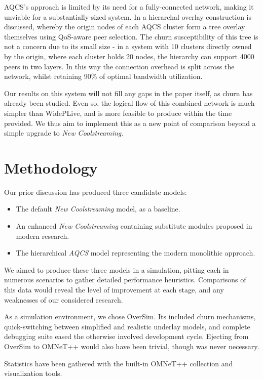 \documentclass[12pt,a4paper]{article}
\begin{document}
AQCS's approach is limited by its need for a fully-connected network, making it unviable for a substantially-sized system. In \cite{Liang2007} a hierarchal overlay construction is discussed, whereby the origin nodes of each AQCS cluster form a tree overlay themselves using QoS-aware peer selection. The churn susceptibility of this tree is not a concern due to its small size - in a system with 10 clusters directly owned by the origin, where each cluster holds 20 nodes, the hierarchy can support 4000 peers in two layers. In this way the connection overhead is split across the network, whilst retaining 90\% of optimal bandwidth utilization.

Our results on this system will not fill any gaps in the paper itself, as churn has already been studied. Even so, the logical flow of this combined network is much simpler than WidePLive, and is more feasible to produce within the time provided. We thus aim to implement this as a new point of comparison beyond a simple upgrade to \textit{New Coolstreaming}.

\section{Methodology} \label{methodology}
Our prior discussion has produced three candidate models:

\begin{itemize}
	\item The default \textit{New Coolstreaming} model, as a baseline.
	\item An enhanced \textit{New Coolstreaming} containing substitute modules proposed in modern research.
	\item The hierarchical \textit{AQCS} model representing the modern monolithic approach.
\end{itemize}

We aimed to produce these three models in a simulation, pitting each in numerous scenarios to gather detailed performance heuristics. Comparisons of this data would reveal the level of improvement at each stage, and any weaknesses of our considered research.

As a simulation environment, we chose OverSim. Its included churn mechanisms, quick-switching between simplified and realistic underlay models, and complete debugging suite eased the otherwise involved development cycle. Ejecting from OverSim to OMNeT++ would also have been trivial, though was never necessary.

Statistics have been gathered with the built-in OMNeT++ collection and visualization tools.
\end{document}
